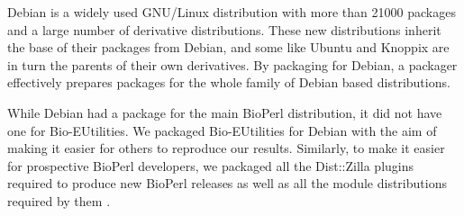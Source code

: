 Debian is a widely used GNU/Linux
distribution with more than 21000 packages and a large
number of derivative distributions.  These new distributions
inherit the base of their packages from Debian, and some like Ubuntu
and Knoppix are in turn the parents of their own derivatives.  By packaging
for Debian, a packager effectively prepares packages for the whole family of
Debian based distributions.

While Debian had a package for the main BioPerl distribution, it did
not have one for Bio-EUtilities.  We packaged Bio-EUtilities for
Debian with the aim of making it easier for
others to reproduce our results.
Similarly, to make it easier for prospective BioPerl
developers, we packaged all the Dist::Zilla plugins required to produce
new BioPerl releases as well
as all the module distributions required by them
.

